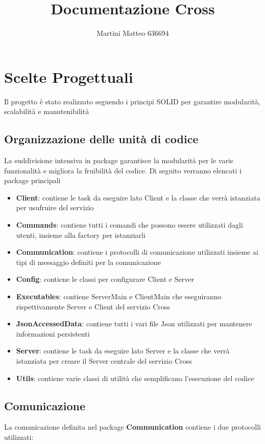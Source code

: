 \documentclass{article}
\title{Documentazione Cross}
\author{Martini Matteo 636694}
\begin{document}
\maketitle

\tableofcontents
\newpage

\section{Scelte Progettuali}
Il progetto è stato realizzato seguendo i principi SOLID per garantire modularità, scalabilità e manutenibilità 
\subsection{Organizzazione delle unità di codice}
La suddivisione intensiva in package garantisce la modularità per le varie funzionalità e migliora la fruibilità del codice.
Di seguito verranno elencati i package principali
\begin{itemize}
    \item \textbf{Client}: contiene le task da eseguire lato Client e la classe che verrà istanziata per usufruire del servizio
    \item \textbf{Commands}: contiene tutti i comandi che possono essere utilizzati dagli utenti, insieme alla factory per istanziarli
    \item \textbf{Communication}: contiene i protocolli di comunicazione utilizzati insieme ai tipi di messaggio definiti per la comunicazione
    \item \textbf{Config}: contiene le classi per configurare Client e Server
    \item \textbf{Executables}: contiene ServerMain e ClientMain che eseguiranno rispettivamente Server e Client del servizio Cross
    \item \textbf{JsonAccessedData}: contiene tutti i vari file Json utilizzati per mantenere informazioni persistenti
    \item \textbf{Server}: contiene le task da eseguire lato Server e la classe che verrà istanziata per creare il Server centrale del servizio Cross
    \item \textbf{Utils}: contiene varie classi di utilità che semplificano l'esecuzione del codice
\end{itemize}

\subsection{Comunicazione}
La comunicazione definita nel package \textbf{Communication} contiene i due protocolli utilizzati:
\end{document}
